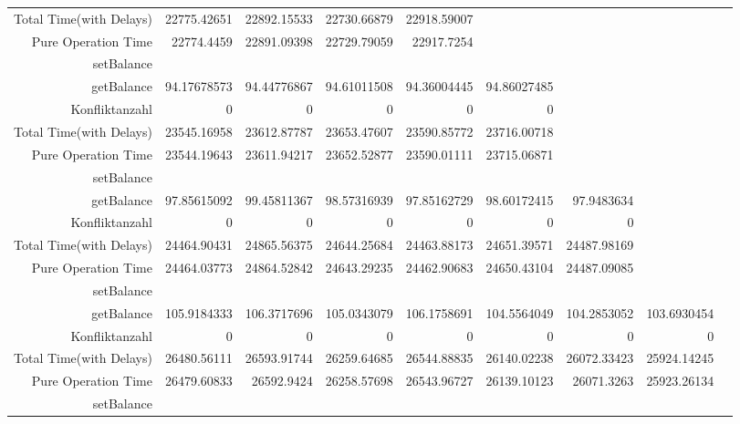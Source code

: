 \begin{landscape}
\begin{table}[htbp]
\begin{tabular}{rrrrrrrrr}
    Total Time(with Delays) & 22775.42651 & 22892.15533 & 22730.66879 & 22918.59007 &       &       &       &  \\
    Pure Operation Time & 22774.4459 & 22891.09398 & 22729.79059 & 22917.7254 &       &       &       &  \\
    \cline{1-9}
    setBalance &       &       &       &       &       &       &       &  \\
    getBalance & 94.17678573 & 94.44776867 & 94.61011508 & 94.36004445 & 94.86027485 &       &       &  \\
    Konfliktanzahl & 0     & 0     & 0     & 0     & 0     &       &       &  \\
    Total Time(with Delays) & 23545.16958 & 23612.87787 & 23653.47607 & 23590.85772 & 23716.00718 &       &       &  \\
    Pure Operation Time & 23544.19643 & 23611.94217 & 23652.52877 & 23590.01111 & 23715.06871 &       &       &  \\
    \cline{1-9}
    setBalance &       &       &       &       &       &       &       &  \\
    getBalance & 97.85615092 & 99.45811367 & 98.57316939 & 97.85162729 & 98.60172415 & 97.9483634 &       &  \\
    Konfliktanzahl & 0     & 0     & 0     & 0     & 0     & 0     &       &  \\
    Total Time(with Delays) & 24464.90431 & 24865.56375 & 24644.25684 & 24463.88173 & 24651.39571 & 24487.98169 &       &  \\
    Pure Operation Time & 24464.03773 & 24864.52842 & 24643.29235 & 24462.90683 & 24650.43104 & 24487.09085 &       &  \\
    \cline{1-9}
    setBalance &       &       &       &       &       &       &       &  \\
    getBalance & 105.9184333 & 106.3717696 & 105.0343079 & 106.1758691 & 104.5564049 & 104.2853052 & 103.6930454 &  \\
    Konfliktanzahl & 0     & 0     & 0     & 0     & 0     & 0     & 0     &  \\
    Total Time(with Delays) & 26480.56111 & 26593.91744 & 26259.64685 & 26544.88835 & 26140.02238 & 26072.33423 & 25924.14245 &  \\
    Pure Operation Time & 26479.60833 & 26592.9424 & 26258.57698 & 26543.96727 & 26139.10123 & 26071.3263 & 25923.26134 &  \\
    \cline{1-9}
    setBalance &       &       &       &       &       &       &       &  \\

\end{tabular}
\end{table}
\end{landscape}
